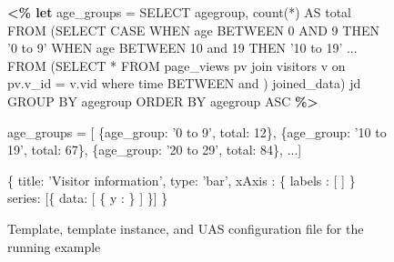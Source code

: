 \begin{figure*}
\centering
%
%
\begin{minipage}[c]{7.5cm}
%
\begin{minipage}[c]{7.5cm}
\begin{code}
\textbf{<\% let} age_groups = 
   SELECT agegroup, count(*) AS total 
   FROM (SELECT CASE
    WHEN age BETWEEN 0 AND 9 THEN '0 to 9'
    WHEN age BETWEEN 10 and 19 THEN '10 to 19'
     ...
    FROM (SELECT * FROM page_views pv join visitors v 
          on pv.v_id = v.vid where time BETWEEN 
           and 
          ) joined_data) jd
   GROUP BY agegroup  
   ORDER BY agegroup ASC \textbf{\%>}
\end{code}
\vspace*{-0.4cm}
\label{figure:running-example:age-group-data-retrieval}
\vspace*{0cm}
\end{minipage}

\begin{minipage}[c]{7.5cm}
\begin{code}
age_groups = [
   \{age_group: '0 to 9', total: 12\}, 
   \{age_group: '10 to 19', total: 67\},
   \{age_group: '20 to 29', total: 84\},  ...]
\end{code}
\vspace*{-0.4cm}
\label{figure:running-example:age-group-query-result}
\vspace*{-0.2cm}
\end{minipage}
%
\end{minipage}
\hspace{1cm}
\begin{minipage}[c]{6cm}

\begin{minipage}[c]{8.5cm}
\begin{code}
  \{
    title: 'Visitor information',
    type: 'bar',
    xAxis : \{ 
      labels : [
        ]
    \}
    series: [\{
      data: [ 
          \{
            y  : 
          \}
         ]
    \}]
  \}
\end{code}
\vspace*{-0.4cm}
\vspace*{0cm}
\label{figure:running-example:age-group-template}
\end{minipage}
\end{minipage}
\vspace*{-0.05cm}
\caption{Template, template instance, and UAS configuration file for the running example}
\vspace*{-0.3cm}
\end{figure*}

